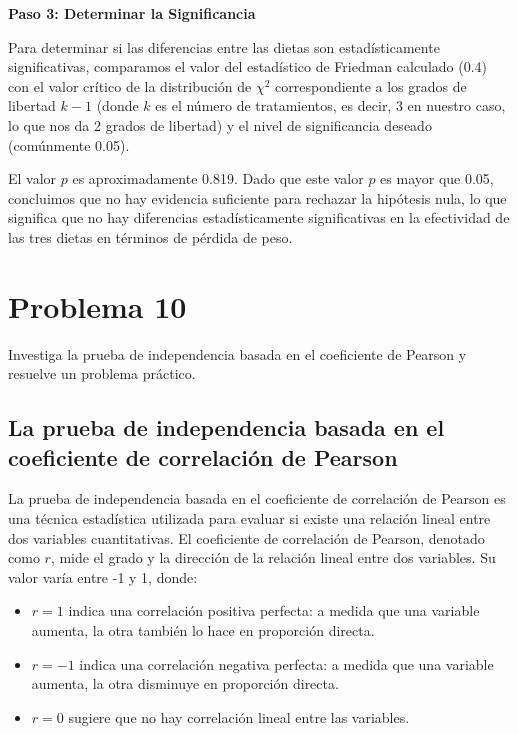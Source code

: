 \documentclass{article}
\begin{document}
\textbf{Paso 3: Determinar la Significancia}

Para determinar si las diferencias entre las dietas son estadísticamente significativas, comparamos el valor del estadístico de Friedman calculado (0.4) con el valor crítico de la distribución de $\chi^2$ correspondiente a los grados de libertad $k-1$ (donde $k$ es el número de tratamientos, es decir, 3 en nuestro caso, lo que nos da 2 grados de libertad) y el nivel de significancia deseado (comúnmente 0.05).

El valor $p$ es  aproximadamente 0.819. Dado que este valor $p$ es mayor que 0.05, concluimos que no hay evidencia suficiente para rechazar la hipótesis nula, lo que significa que no hay diferencias estadísticamente significativas en la efectividad de las tres dietas en términos de pérdida de peso.

\newpage

\section{Problema 10}

Investiga la prueba de independencia basada en el coeficiente de Pearson y resuelve un problema práctico.

\subsection*{La prueba de independencia basada en el coeficiente de correlación de Pearson}

La prueba de independencia basada en el coeficiente de correlación de Pearson es una técnica estadística utilizada para evaluar si existe una relación lineal entre dos variables cuantitativas. El coeficiente de correlación de Pearson, denotado como $r$, mide el grado y la dirección de la relación lineal entre dos variables. Su valor varía entre -1 y 1, donde:

\begin{itemize}
    \item $r=1$ indica una correlación positiva perfecta: a medida que una variable aumenta, la otra también lo hace en proporción directa.
    \item $r=-1$ indica una correlación negativa perfecta: a medida que una variable aumenta, la otra disminuye en proporción directa.
    \item $r=0$ sugiere que no hay correlación lineal entre las variables.
\end{itemize}
\end{document}
